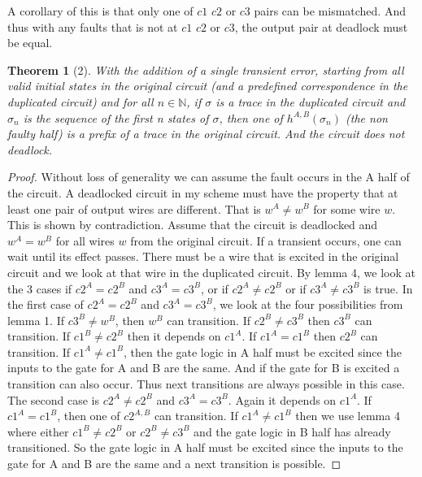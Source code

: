 \documentclass{article}
\newtheorem*{theorem}{Theorem}
\begin{document}
A corollary of this is that only one of $c1$ $c2$ or $c3$ pairs can be mismatched.  And thus with any faults that is not at $c1$ $c2$ or $c3$, the output pair at deadlock must be equal.

\begin{theorem}[2]
With the addition of a single transient error, starting from all valid initial states in the original circuit (and a predefined correspondence in the duplicated circuit) and for all $n \in \mathbb{N}$, if $\sigma$ is a trace in the duplicated circuit and $\sigma_n$ is the sequence of the first n states of $\sigma$, then one of $h^{A,B}(\sigma_n)$ (the non faulty half) is a prefix of a trace in the original circuit.  And the circuit does not deadlock.  
\end{theorem}
\begin{proof}
Without loss of generality we can assume the fault occurs in the A half of the circuit. 
A deadlocked circuit in my scheme must have the property that at least one pair of output wires are different.  That is $w^A\neq w^B$ for some wire $w$.
This is shown by contradiction.  Assume that the circuit is deadlocked and $w^A = w^B$ for all wires $w$ from the original circuit.  If a transient occurs, one can wait until its effect passes.  There
 must be a wire that is excited in the original circuit and we look at that wire in the duplicated circuit. By lemma 4, we look at the 3 cases if $c2^A=c2^B$ and $c3^A=c3^B$, or if $c2^A\neq c2^B$ or if $c3^A\neq c3^B$ is true.  \newline
In the first case of $c2^A=c2^B$ and $c3^A=c3^B$, we look at the four possibilities from lemma 1.  If $c3^B\neq w^B$, then $w^B$ can transition.  If $c2^B\neq c3^B$ then $c3^B$ can transition.  If $c1^B\neq c2^B$ then it depends on $c1^A$.  If $c1^A=c1^B$ then $c2^B$ can transition.  If $c1^A\neq c1^B$, then the gate logic in A half must be excited since the inputs to the gate for A and B are the same.  And if the gate for B is excited a transition can also occur.  Thus next transitions are always possible in this case.\newline
The second case is  $c2^A\neq c2^B$ and $c3^A=c3^B$.  Again it depends on $c1^A$.  If $c1^A=c1^B$, then one of $c2^{A,B}$ can transition.  If $c1^A\neq c1^B$ then we use lemma 4 where either $c1^B \neq c2^B$ or $c2^B \neq c3^B$ and the gate logic in B half has already transitioned.  So the gate logic in A half must be excited since the inputs to the gate for A and B are the same and a next transition is possible.\newline

\end{proof}
\end{document}
